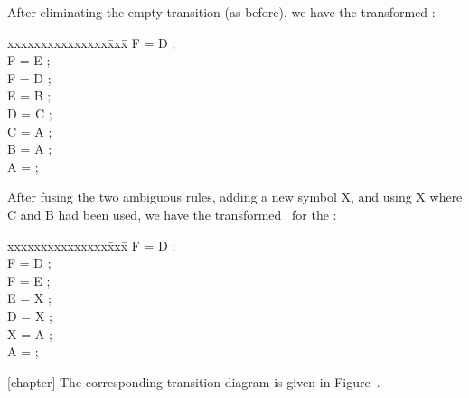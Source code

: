 \noindent After eliminating the empty transition (as before), 
we have the transformed \cfg:

\begin{samepage}
\begin{tt}
\begin{tabbing}
xxxxxxxxxxxxxxx\=xxx\=\kill
\>F = D \sq;                 \\
\>F = E \sq;                 \\
\>F = D \sq;                 \\
\>E = B \sq;                 \\
\>D = C \sq;                 \\
\>C = A \sq;                 \\
\>B = A \sq;                 \\
\>A = ;                           \\
\end{tabbing}
\end{tt}
\end{samepage}


\noindent After fusing the two ambiguous rules, adding a new symbol X, 
and using X where C and B had been used,
we have the transformed \cfg\ for the \dfa:

\begin{samepage}
\begin{tt}
\begin{tabbing}
xxxxxxxxxxxxxxx\=xxx\=\kill
\>F = D \sq;                 \\
\>F = D \sq;                 \\
\>F = E \sq;                 \\
\>E = X \sq;                 \\
\>D = X \sq;                 \\
\>X = A \sq;                 \\
\>A = ;                           \\
\end{tabbing}
\end{tt}
\end{samepage}

[chapter]
\setcounter{dfamatrix}{\value{figure}}
\noindent The corresponding transition diagram is given in Figure~\thefigure.

